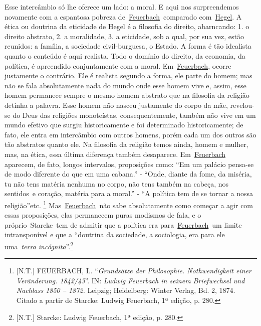 Esse intercâmbio só lhe oferece um lado: a moral. E aqui nos
surpreendemos novamente com a espantosa pobreza
de~\href{https://www.marxists.org/portugues/dicionario/verbetes/f/feuerbach.htm}{Feuerbach}~comparado
com~\href{https://www.marxists.org/portugues/dicionario/verbetes/h/hegel.htm}{Hegel}.
A ética ou doutrina da eticidade de Hegel é a filosofia do direito,
abarncando: 1. o direito abstrato, 2. a moralidade, 3. a eticidade, sob
a qual, por sua vez, estão reunidos: a família, a sociedade
civil-burguesa, o Estado. A forma é tão idealista quanto o conteúdo é
aqui realista. Todo o domínio do direito, da economia, da política, é
apreendido conjuntamente com a moral.
Em~\href{https://www.marxists.org/portugues/dicionario/verbetes/f/feuerbach.htm}{Feuerbach},
ocorre justamente o contrário. Ele é realista segundo a forma, ele parte
do homem; mas não se fala absolutamente nada do mundo onde esse homem
vive e, assim, esse homem permanece sempre o mesmo homem abstrato que na
filosofia da religião detinha a palavra. Esse homem não nasceu
justamente do corpo da mãe, revelou-se do Deus das religiões
monoteístas, consequentemente, também não vive em um mundo efetivo que
surgiu historicamente e foi determinado historicamente; de fato, ele
entra em intercâmbio com outros homens, porém cada um dos outros são tão
abstratos quanto ele. Na filosofia da religião temos ainda, homem e
mulher, mas, na ética, essa última diferença também desaparece.
Em~\href{https://www.marxists.org/portugues/dicionario/verbetes/f/feuerbach.htm}{Feuerbach}
aparecem, de fato, longos intervalos, proposições como: ``Em um palácio
pensa-se de modo diferente do que em uma cabana.'' - ``Onde, diante da
fome, da miséria, tu não tens matéria nenhuma no corpo, não tens também
na cabeça, nos sentidos\protect\hypertarget{r20}{}{}~e coração, matéria
para a moral.'' - ``A política tem de se tornar a nossa
religião''\protect\hypertarget{r21}{}{}etc. \footnote{{[}N.T.{]}
  FEUERBACH, L. ``\emph{Grundsätze der Philosophie. Nothwendigkeit einer
  Veränderung. 1842/43}''. IN: \emph{Ludwig Feuerbach in seinem
  Briefwechsel und Nachlass 1850 -- 1872.} Leipzig; Heidelberg: Winter
  Verlag, Bd. 2, 1874. Citado a partir de Starcke: Ludwig Feuerbach, 1ª
  edição, p. 280.}
Mas~\href{https://www.marxists.org/portugues/dicionario/verbetes/f/feuerbach.htm}{Feuerbach}~não
sabe absolutamente como começar a agir com essas proposições, elas
permanecem puras modismos de fala, e o próprio~Starcke~tem de admitir
que a política era
para~\href{https://www.marxists.org/portugues/dicionario/verbetes/f/feuerbach.htm}{Feuerbach}~um
limite intransponível e que a ``doutrina da sociedade, a sociologia, era
para ele uma~\emph{terra
incógnita}''.\protect\hypertarget{r22}{}{}\footnote{{[}N.T.{]} Starcke:
  Ludwig Feuerbach, 1ª edição, p. 280.}

